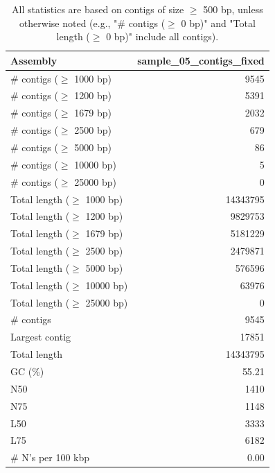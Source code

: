 \documentclass[12pt,a4paper]{article}
\begin{document}
\begin{table}[ht]
\begin{center}
\caption{All statistics are based on contigs of size $\geq$ 500 bp, unless otherwise noted (e.g., "\# contigs ($\geq$ 0 bp)" and "Total length ($\geq$ 0 bp)" include all contigs).}
\begin{tabular}{|l*{1}{|r}|}
\hline
Assembly & sample\_05\_contigs\_fixed \\ \hline
\# contigs ($\geq$ 1000 bp) & 9545 \\ \hline
\# contigs ($\geq$ 1200 bp) & 5391 \\ \hline
\# contigs ($\geq$ 1679 bp) & 2032 \\ \hline
\# contigs ($\geq$ 2500 bp) & 679 \\ \hline
\# contigs ($\geq$ 5000 bp) & 86 \\ \hline
\# contigs ($\geq$ 10000 bp) & 5 \\ \hline
\# contigs ($\geq$ 25000 bp) & 0 \\ \hline
Total length ($\geq$ 1000 bp) & 14343795 \\ \hline
Total length ($\geq$ 1200 bp) & 9829753 \\ \hline
Total length ($\geq$ 1679 bp) & 5181229 \\ \hline
Total length ($\geq$ 2500 bp) & 2479871 \\ \hline
Total length ($\geq$ 5000 bp) & 576596 \\ \hline
Total length ($\geq$ 10000 bp) & 63976 \\ \hline
Total length ($\geq$ 25000 bp) & 0 \\ \hline
\# contigs & 9545 \\ \hline
Largest contig & 17851 \\ \hline
Total length & 14343795 \\ \hline
GC (\%) & 55.21 \\ \hline
N50 & 1410 \\ \hline
N75 & 1148 \\ \hline
L50 & 3333 \\ \hline
L75 & 6182 \\ \hline
\# N's per 100 kbp & 0.00 \\ \hline
\end{tabular}
\end{center}
\end{table}
\end{document}

